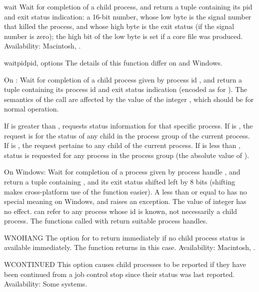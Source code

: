 \begin{funcdesc}{wait}{}
Wait for completion of a child process, and return a tuple containing
its pid and exit status indication: a 16-bit number, whose low byte is
the signal number that killed the process, and whose high byte is the
exit status (if the signal number is zero); the high bit of the low
byte is set if a core file was produced.
Availability: Macintosh, \UNIX.
\end{funcdesc}

\begin{funcdesc}{waitpid}{pid, options}
The details of this function differ on \UNIX{} and Windows.

On \UNIX:
Wait for completion of a child process given by process id ,
and return a tuple containing its process id and exit status
indication (encoded as for ).  The semantics of the
call are affected by the value of the integer , which
should be  for normal operation.

If  is greater than ,  requests
status information for that specific process.  If  is
, the request is for the status of any child in the process
group of the current process.  If  is , the request
pertains to any child of the current process.  If  is less
than , status is requested for any process in the process
group  (the absolute value of ).

On Windows:
Wait for completion of a process given by process handle ,
and return a tuple containing ,
and its exit status shifted left by 8 bits (shifting makes cross-platform
use of the function easier).
A  less than or equal to  has no special meaning on
Windows, and raises an exception.
The value of integer  has no effect.
 can refer to any process whose id is known, not necessarily a
child process.
The  functions called with 
return suitable process handles.
\end{funcdesc}

\begin{datadesc}{WNOHANG}
The option for  to return immediately if no child
process status is available immediately. The function returns
 in this case.
Availability: Macintosh, \UNIX.
\end{datadesc}

\begin{datadesc}{WCONTINUED}
This option causes child processes to be reported if they have been
continued from a job control stop since their status was last
reported.
Availability: Some \UNIX{} systems.
\end{datadesc}

